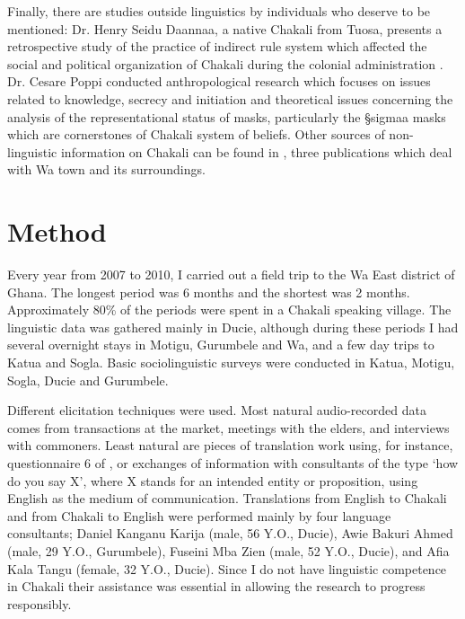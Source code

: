 Finally, there are studies outside linguistics by individuals who deserve to be
mentioned:  Dr. Henry Seidu Daannaa,   a native Chakali from Tuosa,  presents a
retrospective study of the practice of indirect rule system which affected the
social and political organization of  Chakali during the colonial administration
\citep{Daan94}.   Dr. Cesare Poppi conducted anthropological research which
focuses on issues related to knowledge, secrecy and initiation \citep{Popp93}
and  theoretical issues concerning the analysis of the representational status
of masks, particularly the {\S sigmaa} masks which are cornerstones of Chakali
system of beliefs.  Other sources of non-linguistic  information on Chakali can
be found in \cite{Doug66, Wilk89, Sali08},  three  publications  which deal with
Wa town and its surroundings. 


\section{Method}
\label{sec:INT-method}


Every year from 2007 to  2010, I carried out a field trip to the Wa East
district of Ghana. The longest period  was 6 months and the shortest was 2
months. Approximately 80\% of the periods were spent in a Chakali speaking
village. The linguistic data was gathered mainly in Ducie, although during these
periods I had several overnight stays in Motigu, Gurumbele and Wa, and a few day
trips to Katua and Sogla. Basic sociolinguistic surveys were conducted in Katua,
Motigu, Sogla, Ducie and Gurumbele.  



Different elicitation techniques were used.  Most natural audio-recorded data
comes from  transactions at the market, meetings with the elders,  and
interviews with commoners. Least natural are pieces of translation work using,
for instance, questionnaire 6 of \citet[257-270]{Bouq92},  or exchanges of
information with consultants of the type `how do you say X', where X stands for
an intended entity or proposition, using English as the medium of communication.
Translations from English to Chakali and from Chakali to English  were performed
mainly by four language consultants; Daniel Kanganu Karija (male, 56 Y.O.,
Ducie), Awie Bakuri Ahmed (male, 29 Y.O., Gurumbele), Fuseini Mba Zien (male, 52
Y.O., Ducie), and Afia Kala Tangu (female, 32 Y.O., Ducie). Since I do not
have linguistic competence in Chakali  their assistance was essential in 
allowing the research to progress responsibly. 


